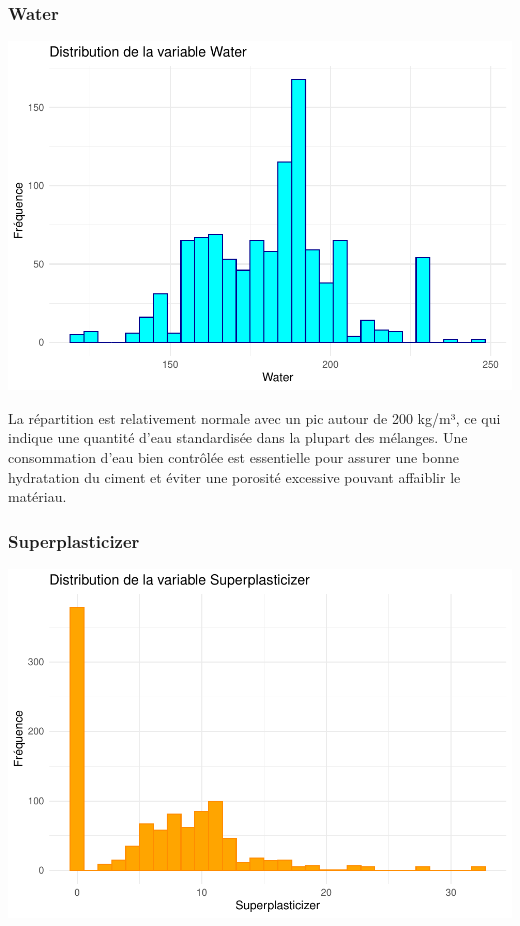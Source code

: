 \documentclass[
  12pt,
]{article}
\begin{document}
\subsubsection{Water}\label{water}

\includegraphics{rmd_final_files/figure-latex/unnamed-chunk-4-1.pdf}

La répartition est relativement normale avec un pic autour de 200 kg/m³,
ce qui indique une quantité d'eau standardisée dans la plupart des
mélanges. Une consommation d'eau bien contrôlée est essentielle pour
assurer une bonne hydratation du ciment et éviter une porosité excessive
pouvant affaiblir le matériau.

\subsubsection{Superplasticizer}\label{superplasticizer}

\includegraphics{rmd_final_files/figure-latex/unnamed-chunk-5-1.pdf}
\end{document}
